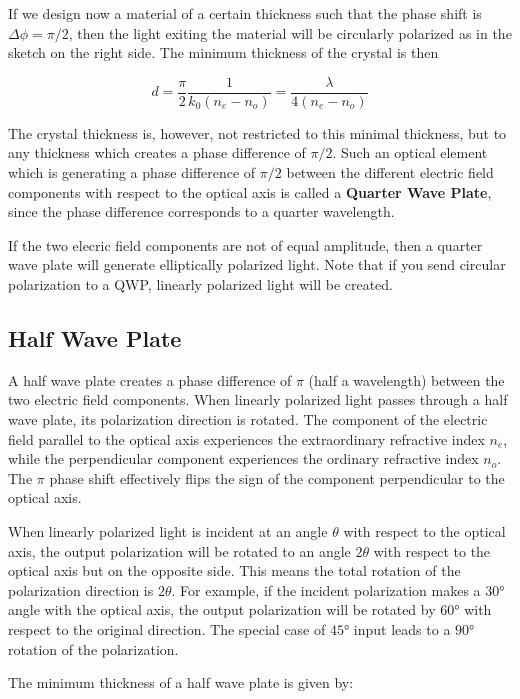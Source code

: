 \documentclass[
  a4paper,
]{book}
\begin{document}
If we design now a material of a certain thickness such that the phase
shift is \(\Delta \phi=\pi/2\), then the light exiting the material will
be circularly polarized as in the sketch on the right side. The minimum
thickness of the crystal is then

\[
d=\frac{\pi}{2}\frac{1}{k_0(n_e-n_o)}=\frac{\lambda}{4(n_e-n_o)}
\]

The crystal thickness is, however, not restricted to this minimal
thickness, but to any thickness which creates a phase difference of
\(\pi/2\). Such an optical element which is generating a phase
difference of \(\pi/2\) between the different electric field components
with respect to the optical axis is called a \textbf{Quarter Wave
Plate}, since the phase difference corresponds to a quarter wavelength.

If the two elecric field components are not of equal amplitude, then a
quarter wave plate will generate elliptically polarized light. Note that
if you send circular polarization to a QWP, linearly polarized light
will be created.

\subsection{Half Wave Plate}\label{half-wave-plate}

A half wave plate creates a phase difference of \(\pi\) (half a
wavelength) between the two electric field components. When linearly
polarized light passes through a half wave plate, its polarization
direction is rotated. The component of the electric field parallel to
the optical axis experiences the extraordinary refractive index \(n_e\),
while the perpendicular component experiences the ordinary refractive
index \(n_o\). The \(\pi\) phase shift effectively flips the sign of the
component perpendicular to the optical axis.

When linearly polarized light is incident at an angle \(\theta\) with
respect to the optical axis, the output polarization will be rotated to
an angle \(2\theta\) with respect to the optical axis but on the
opposite side. This means the total rotation of the polarization
direction is \(2\theta\). For example, if the incident polarization
makes a \(30°\) angle with the optical axis, the output polarization
will be rotated by \(60°\) with respect to the original direction. The
special case of \(45°\) input leads to a \(90°\) rotation of the
polarization.

The minimum thickness of a half wave plate is given by:
\end{document}
